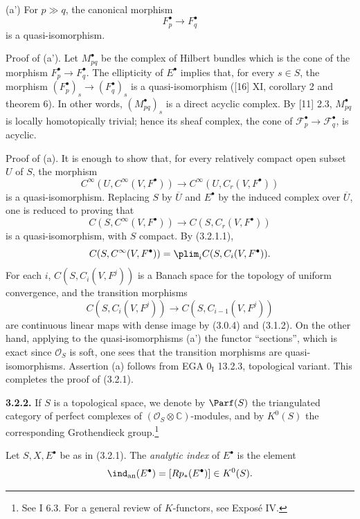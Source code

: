 (a') For $p\gg q$, the canonical morphism
\[
 F_p^\bullet\longrightarrow F_q^\bullet
\]
is a quasi-isomorphism.

Proof of (a'). Let $M_{pq}^\bullet$ be the complex of Hilbert bundles which is the cone of the morphism $F_p^\bullet\to F_q^\bullet$. The ellipticity of $E^\bullet$ implies that, for every $s\in S$, the morphism $(F_p^\bullet)_s\to(F_q^\bullet)_s$ is a quasi-isomorphism ([16] XI, corollary 2 and theorem 6). In other words, $(M_{pq}^\bullet)_s$ is a direct acyclic complex. By [11] 2.3, $M_{pq}^\bullet$ is locally homotopically trivial; hence its sheaf complex, the cone of $\mathcal F_p^\bullet\to\mathcal F_q^\bullet$, is acyclic.

Proof of (a). It is enough to show that, for every relatively compact open subset $U$ of $S$, the morphism
\[
 C^\infty(U,C^\infty(V,F^\bullet))\longrightarrow C^\infty(U,C_r(V,F^\bullet))
\]
is a quasi-isomorphism. Replacing $S$ by $\overline U$ and $E^\bullet$ by the induced complex over $\overline U$, one is reduced to proving that
\[
 C(S,C^\infty(V,F^\bullet))\longrightarrow C(S,C_r(V,F^\bullet))
\]
is a quasi-isomorphism, with $S$ compact. By (3.2.1.1),
\[
 C(S,C^\infty(V,F^\bullet))=\plim_i C(S,C_i(V,F^\bullet)).
\]
For each $i$, $C(S,C_i(V,F^j))$ is a Banach space for the topology of uniform convergence, and the transition morphisms
\[
 C(S,C_i(V,F^j))\longrightarrow C(S,C_{i-1}(V,F^j))
\]
are continuous linear maps with dense image by (3.0.4) and (3.1.2). On the other hand, applying to the quasi-isomorphisms (a') the functor ``sections'', which is exact since $\mathcal O_S$ is soft, one sees that the transition morphisms are quasi-isomorphisms. Assertion (a) follows from EGA $0_{\mathrm I}$ 13.2.3, topological variant. This completes the proof of (3.2.1).

\textbf{3.2.2.} If $S$ is a topological space, we denote by $\Parf(S)$ the triangulated category of perfect complexes of $(\mathcal O_S\otimes\mathbb C)$-modules, and by $K^0(S)$ the corresponding Grothendieck group.\footnote{See I 6.3. For a general review of $K$-functors, see Exposé IV.}

Let $S,X,E^\bullet$ be as in (3.2.1). The \emph{analytic index} of $E^\bullet$ is the element
\[
 \ind_{\mathrm{an}}(E^\bullet)=[Rp_*(E^\bullet)]\in K^0(S).
\]

